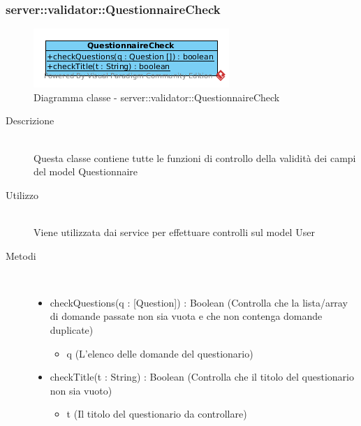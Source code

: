 \vspace{0.5cm}
\hypertarget{server::validator::QuestionnaireCheck}{}
\subsubsection[QuestionnaireCheck]{server::validator::QuestionnaireCheck}
\begin{center}
			\begin{figure}[H]
				\centering \includegraphics[scale=4, max width=\textwidth, max height=\myheight]{../img/diagrammiClassi/server/validator/QuestionnaireCheck.png}
				\caption{Diagramma classe - server::validator::QuestionnaireCheck}
			\end{figure}
		\end{center}\begin{description}
\item[Descrizione] \hfill \\
 Questa classe contiene tutte le funzioni di controllo della validità dei campi del model Questionnaire
\item[Utilizzo] \hfill \\
 Viene utilizzata dai service per effettuare controlli sul model User
\item[Metodi] \hfill \\
 \vspace{-7mm}
\begin{itemize}
\item checkQuestions(q : [Question]) : Boolean (Controlla che la lista/array di domande passate non sia vuota e che non contenga domande duplicate)\begin{itemize}
\item q (L'elenco delle domande del questionario)
\end{itemize}

\item checkTitle(t : String) : Boolean (Controlla che il titolo del questionario non sia vuoto)\begin{itemize}
\item t (Il titolo del questionario da controllare)
\end{itemize}

\end{itemize}

\end{description}

